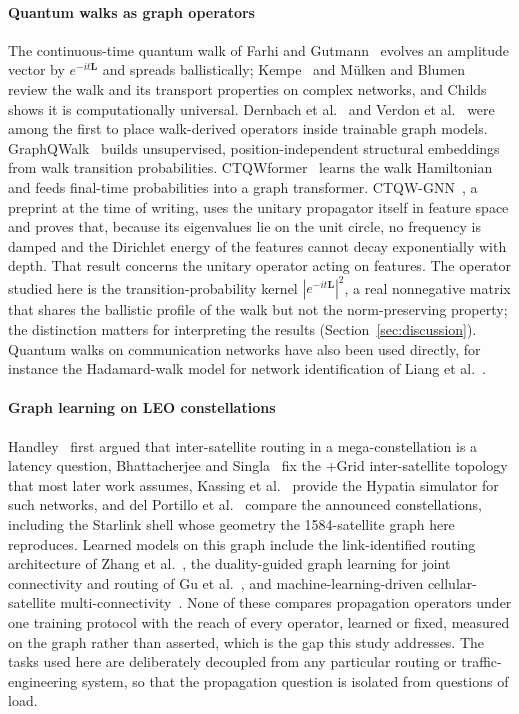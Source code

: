 \documentclass[preprint,11pt,3p]{elsarticle}
\newcommand{\Lap}{\mathbf{L}}
\begin{document}
\paragraph{Quantum walks as graph operators}
The continuous-time quantum walk of Farhi and Gutmann~\cite{farhi} evolves an amplitude
vector by $e^{-it\Lap}$ and spreads ballistically; Kempe~\cite{kempe} and M\"ulken and
Blumen~\cite{mulken} review the walk and its transport properties on complex networks, and
Childs~\cite{childs} shows it is computationally universal. Dernbach et al.~\cite{qwnn} and Verdon et
al.~\cite{qgnn} were among the first to place walk-derived operators inside trainable graph
models. GraphQWalk~\cite{graphqwalk} builds unsupervised, position-independent structural
embeddings from walk transition probabilities. CTQWformer~\cite{ctqwformer} learns the walk
Hamiltonian and feeds final-time probabilities into a graph transformer. CTQW-GNN~\cite{ctqwgnn}, a preprint at the time of writing,
uses the unitary propagator itself in feature space and proves that, because its eigenvalues lie
on the unit circle, no frequency is damped and the Dirichlet energy of the features cannot decay
exponentially with depth. That result concerns the unitary operator acting on features. The
operator studied here is the transition-probability kernel $|e^{-it\Lap}|^{2}$, a real
nonnegative matrix that shares the ballistic profile of the walk but not the norm-preserving
property; the distinction matters for interpreting the results
(Section~\ref{sec:discussion}). Quantum walks on communication networks have also been used
directly, for instance the Hadamard-walk model for network identification of
Liang et al.~\cite{hadamard}.

\paragraph{Graph learning on LEO constellations}
Handley~\cite{handley} first argued that inter-satellite routing in a mega-constellation is
a latency question, Bhattacherjee and Singla~\cite{plusgrid} fix the +Grid inter-satellite
topology that most later work assumes, Kassing et al.~\cite{hypatia} provide the Hypatia
simulator for such networks, and del Portillo et al.~\cite{starlink} compare the announced
constellations, including the Starlink shell whose geometry the 1584-satellite graph here
reproduces. Learned models on this graph include the link-identified routing architecture of
Zhang et al.~\cite{lira}, the duality-guided graph learning for joint connectivity and routing
of Gu et al.~\cite{deepladu}, and machine-learning-driven cellular-satellite
multi-connectivity~\cite{comsat}. None of these compares propagation operators under one training protocol
with the reach of every operator, learned or fixed, measured on the graph rather than asserted,
which is the gap this study addresses. The tasks used here are
deliberately decoupled from any particular routing or traffic-engineering system, so that the
propagation question is isolated from questions of load.
\end{document}
